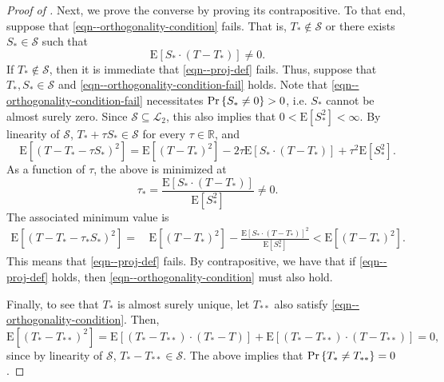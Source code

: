 \documentclass[12pt]{article}
\def\Pr{\mathop{\rm Pr}\nolimits}
\numberwithin{equation}{section}
\theoremstyle{definition}
\theoremstyle{plain}
\begin{document}
\begin{proof}[Proof of ]
Next, we prove the converse by proving its contrapositive.
To that end, suppose that \eqref{eqn--orthogonality-condition} fails.
That is, \(T_{\ast} \not\in \mathcal{S}\) or there exists \(S_{\ast} \in
\mathcal{S}\) such that
\begin{equation}
  \mathrm{E} \left[ S_{\ast} \cdot \left( T - T_{\ast} \right) \right] \neq 0.
  \label{eqn--orthogonality-condition-fail}
\end{equation}
If \(T_{\ast} \not\in \mathcal{S}\), then it is immediate that
\eqref{eqn--proj-def} fails.
Thus, suppose that \(T_{\ast}, S_{\ast} \in \mathcal{S}\) and
\eqref{eqn--orthogonality-condition-fail} holds.
Note that \eqref{eqn--orthogonality-condition-fail} necessitates \(\Pr \left\{
S_{\ast} \neq 0 \right\} > 0\), i.e. \(S_{\ast}\) cannot be almost surely zero.
Since \(\mathcal{S} \subseteq \mathscr{L}_{2}\), this also implies that \(0 <
\mathrm{E} \left[ S_{\ast}^{2} \right] < \infty\).
By linearity of \(\mathcal{S}\), \(T_{\ast} + \tau S_{\ast} \in \mathcal{S}\)
for every \(\tau \in \mathbb{R}\), and
\begin{equation*}
  \mathrm{E} \left[ \left( T - T_{\ast} - \tau S_{\ast} \right)^{2} \right] =
  \mathrm{E} \left[ \left( T - T_{\ast} \right)^{2} \right] - 2 \tau \mathrm{E}
  \left[ S_{\ast} \cdot \left( T - T_{\ast} \right) \right] + \tau^{2}
  \mathrm{E} \left[ S_{\ast}^{2} \right].
\end{equation*}
As a function of \(\tau\), the above is minimized at
\begin{equation*}
  \tau_{\ast} = \frac{\mathrm{E} \left[ S_{\ast} \cdot \left( T - T_{\ast}
  \right) \right]}{ \mathrm{E} \left[ S_{\ast}^{2} \right]} \neq 0.
\end{equation*}
The associated minimum value is
\begin{align*}
  \mathrm{E} \left[ \left( T - T_{\ast} - \tau_{\ast} S_{\ast} \right)^{2}
  \right] =
  & \, \mathrm{E} \left[ \left( T - T_{\ast} \right)^{2} \right] -
  \frac{\mathrm{E} \left[ S_{\ast} \cdot \left( T - T_{\ast} \right)
  \right]^{2}}{\mathrm{E} \left[ S_{\ast}^{2} \right]} < \mathrm{E} \left[
  \left( T - T_{\ast} \right)^{2} \right].
\end{align*}
This means that \eqref{eqn--proj-def} fails.
By contrapositive, we have that if \eqref{eqn--proj-def} holds, then
\eqref{eqn--orthogonality-condition} must also hold.

Finally, to see that \(T_{\ast}\) is almost surely unique, let \(T_{\ast \ast}\)
also satisfy \eqref{eqn--orthogonality-condition}.
Then,
\begin{equation*}
  \mathrm{E} \left[ \left( T_{\ast} - T_{\ast \ast} \right)^{2} \right] =
  \mathrm{E} \left[ \left( T_{\ast} - T_{\ast \ast} \right) \cdot \left(
  T_{\ast} - T \right) \right] + \mathrm{E} \left[ \left( T_{\ast} - T_{\ast
  \ast} \right) \cdot \left( T - T_{\ast \ast} \right) \right] = 0,
\end{equation*}
since by linearity of \(\mathcal{S}\), \(T_{\ast} - T_{\ast \ast} \in
\mathcal{S}\).
The above implies that \(\Pr \left\{T_{\ast} \neq T_{\ast \ast} \right\} = 0\).
\end{proof}
\end{document}
